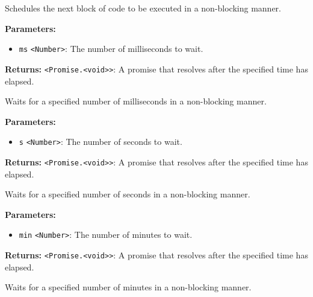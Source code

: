 \documentclass[12pt,a4paper]{article}
\begin{document}
\noindent Schedules the next block of code to be executed in a non-blocking manner.

\vspace{5mm}
\noindent {}


\noindent \textbf{Parameters:}
\begin{itemize}
  \item \texttt{ms} \texttt{<Number>}: The number of milliseconds to wait.
\end{itemize}

\noindent \textbf{Returns:} \texttt{<Promise.<void>>}: A promise that resolves after the specified time has elapsed.

\noindent Waits for a specified number of milliseconds in a non-blocking manner.

\vspace{5mm}
\noindent {}


\noindent \textbf{Parameters:}
\begin{itemize}
  \item \texttt{s} \texttt{<Number>}: The number of seconds to wait.
\end{itemize}

\noindent \textbf{Returns:} \texttt{<Promise.<void>>}: A promise that resolves after the specified time has elapsed.

\noindent Waits for a specified number of seconds in a non-blocking manner.

\vspace{5mm}
\noindent {}


\noindent \textbf{Parameters:}
\begin{itemize}
  \item \texttt{min} \texttt{<Number>}: The number of minutes to wait.
\end{itemize}

\noindent \textbf{Returns:} \texttt{<Promise.<void>>}: A promise that resolves after the specified time has elapsed.

\noindent Waits for a specified number of minutes in a non-blocking manner.
\end{document}
